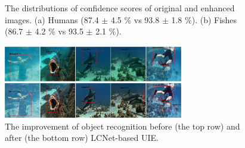 \documentclass[journal]{IEEEtran}
\begin{document}
\begin{figure}[ht]
\centering  %
\hspace{12mm}
\caption{The distributions of confidence scores of original and enhanced images. (a) Humans (87.4 $\pm$ 4.5 \(\%\) vs 93.8 $\pm$ 1.8 \(\%\)). (b) Fishes (86.7 $\pm$ 4.2 \(\%\) vs 93.5 $\pm$ 2.1 \(\%\)).}
\label{Fig9}
\end{figure}



\begin{figure}[h]
\centering
{
\includegraphics[width=0.7\textwidth]{Figs/Fig10.jpg}

}
\caption{The improvement of object recognition before (the top row) and after (the bottom row) LCNet-based UIE.}
\label{Fig10}
\end{figure}
\end{document}
